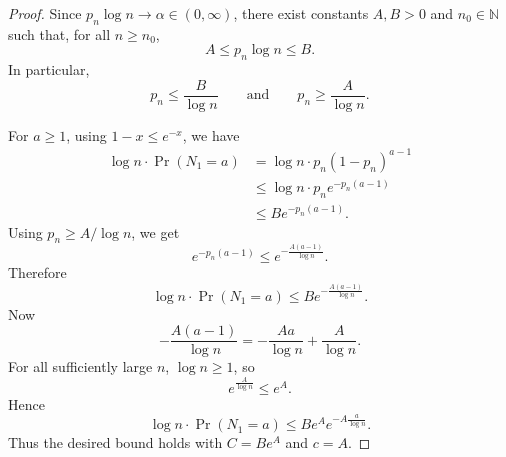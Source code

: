 \documentclass[10pt,a4paper]{amsart}
\begin{document}
\begin{proof}
Since \(p_n\log n\to \alpha\in(0,\infty)\), there exist constants
\(A,B>0\) and \(n_0\in\mathbb N\) such that, for all \(n\ge n_0\),
\[
    A \le p_n\log n \le B.
\]
In particular,
\[
    p_n\le \frac{B}{\log n}
    \qquad\text{and}\qquad
    p_n\ge \frac{A}{\log n}.
\]

For \(a\ge 1\), using \(1-x\le e^{-x}\), we have
\[
\begin{aligned}
    \log n\cdot \Pr(N_1=a)
    &= \log n\cdot p_n(1-p_n)^{a-1} \\
    &\le \log n\cdot  p_n e^{-p_n(a-1)} \\
    &\le B e^{-p_n(a-1)}.
\end{aligned}
\]
Using \(p_n\ge A/\log n\), we get
\[
    e^{-p_n(a-1)}
    \le
    e^{-\frac{A(a-1)}{\log n}}.
\]
Therefore
\[
    \log n\cdot \Pr(N_1=a)
    \le
    Be^{-\frac{A(a-1)}{\log n}}.
\]
Now
\[
    -\frac{A(a-1)}{\log n}
    =
    -\frac{Aa}{\log n}+\frac{A}{\log n}.
\]
For all sufficiently large \(n\), \(\log n\ge 1\), so
\[
    e^{\frac{A}{\log n}}\le e^A.
\]
Hence
\[
    \log n\cdot \Pr(N_1=a)
    \le
    Be^A
    e^{-A\frac{a}{\log n}}.
\]
Thus the desired bound holds with $C=Be^A$ and $c=A$.
\end{proof}
\end{document}
